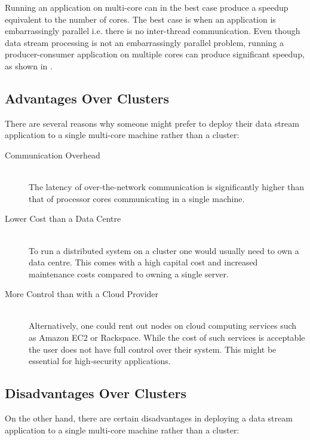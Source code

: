 Running an application on multi-core can in the best case produce a speedup equivalent to the number of cores. The best case is when an application is embarrassingly parallel i.e. there is no inter-thread communication. Even though data stream processing is not an embarrassingly parallel problem, running a producer-consumer application on multiple cores can produce significant speedup, as shown in  \citep{Prat-Perez:2013:PPM:2450027.2450037}.


\subsection{Advantages Over Clusters}
\label{subsec:advantages}

There are several reasons why someone might prefer to deploy their data stream application to a single multi-core machine rather than a cluster:

\begin{description}
	\item[Communication Overhead] \hfill \\
	The latency of over-the-network communication is significantly higher than that of processor cores communicating in a single machine.
	\item[Lower Cost than a Data Centre] \hfill \\
	To run a distributed system on a cluster one would usually need to own a data centre. This comes with a high capital cost and increased maintenance costs compared to owning a single server.
	\item[More Control than with a Cloud Provider] \hfill \\
	Alternatively, one could rent out nodes on cloud computing services such as Amazon EC2 or Rackspace. While the cost of such services is acceptable the user does not have full control over their system. This might be essential for high-security applications.
\end{description}

\subsection{Disadvantages Over Clusters}
\label{subsec:disadvantages}

On the other hand, there are certain disadvantages in deploying a data stream application to a single multi-core machine rather than a cluster:

